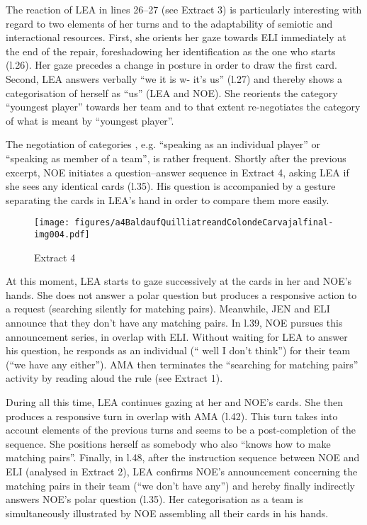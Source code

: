 \documentclass[output=paper]{langscibook}
\begin{document}
The reaction of LEA in lines 26--27 (see Extract 3) is particularly interesting with regard to two elements of her turns and to the adaptability of semiotic and interactional resources. First, she orients her gaze towards ELI immediately at the end of the repair, foreshadowing her identification as the one who starts (l.26). Her gaze precedes a change in posture in order to draw the first card. Second, LEA answers verbally “we it is w- it’s us” (l.27) and thereby shows a categorisation of herself as “us” (LEA and NOE). She reorients the category “youngest player” towards her team and to that extent re-negotiates the category of what is meant by “youngest player”.

The negotiation of categories \citep{Stokoe2012}, e.g. “speaking as an individual player” or “speaking as member of a team”, is rather frequent. Shortly after the previous excerpt, NOE initiates a question–answer sequence in Extract 4, asking LEA if she sees any identical cards (l.35). His question is accompanied by a gesture separating the cards in LEA’s hand in order to compare them more easily.   

\begin{figure}[p]
\caption{Extract 4\label{fig:13:extract4}}
\texttt{[image: figures/a4BaldaufQuilliatreandColondeCarvajalfinal-img004.pdf]}
\end{figure}
 

At this moment, LEA starts to gaze successively at the cards in her and NOE’s hands. She does not answer a polar question but produces a responsive action to a request (searching silently for matching pairs). Meanwhile, JEN and ELI announce that they don’t have any matching pairs. In l.39, NOE pursues this announcement series, in overlap with ELI. Without waiting for LEA to answer his question, he responds as an individual (“ well I don't think”) for their team (“we have any either”). AMA then terminates the “searching for matching pairs” activity by reading aloud the rule (see Extract 1).

During all this time, LEA continues gazing at her and NOE’s cards. She then produces a responsive turn in overlap with AMA (l.42). This turn takes into account elements of the previous turns and seems to be a post-completion of the sequence. She positions herself as somebody who also “knows how to make matching pairs”. Finally, in l.48, after the instruction sequence between NOE and ELI (analysed in Extract 2), LEA confirms NOE’s announcement concerning the matching pairs in their team (“we don’t have any”) and hereby finally indirectly answers NOE’s polar question (l.35). Her categorisation as a team is simultaneously illustrated by NOE assembling all their cards in his hands.
\end{document}
